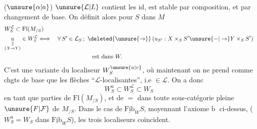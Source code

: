 ($\unsure{\alpha|a}$) $\unsure{\mathcal L|L}$ contient les id, est stable par composition, et par changement de base.
On définit alors pour  $S$ dans $M$
\[
\begin{aligned}
&W_S^{\mathcal L}\subset\mathrm{Fl}(M_{/S})\\
&\underset{\substack{\Vert\\(X\to Y)}}{u}\in W_S^{\mathcal L}
\Longleftrightarrow\quad\forall\, S'\in\mathcal L_S\,;\ \deleted{\unsure{\to}}\,
(u_{S'}:X\mathbin{\times_S} S'\unsure{-|\to}Y\mathbin{\times_S}S')\\
&\hspace{15em}\text{est dans }W.
\end{aligned}
\]
C'est  une variante du localiseur $W_S^{\unsure{u|v}}$, où maintenant on ne prend comme chgts de base que les flèches  ``$\mathcal L$-localisantes'', i.e $\in\mathcal L$. On a donc
\[
W_S^u\subset W_S^{\mathcal L}\subset W_S
\]
en tant que parties de $\mathrm{Fl}(M_{/S})$, et de $=$ dans toute sous-catégorie pleine $\unsure{F|\mathcal F}$ de $M_{/S}$. Dans le cas de $\underline{\mathrm{Fib}}_W S$, moyennant l'axiome \textcircled{b} ci-dessus, ($W_S^u=W_S$ dans $\underline{\mathrm{Fib}}_W S$), les trois localiseurs coïncident.


